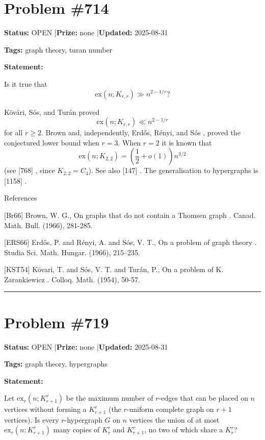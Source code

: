 \documentclass{article}
\begin{document}
\section{Problem \#714}
\label{prob:714}

\noindent\textbf{Status:} OPEN \quad|\quad \textbf{Prize:} none \quad|\quad \textbf{Updated:} 2025-08-31

\noindent\textbf{Tags:} graph theory, turan number

\medskip

\noindent\textbf{Statement:}

Is it true that\[\mathrm{ex}(n; K_{r,r}) \gg n^{2-1/r}?\]




K\"{o}v\'{a}ri, S\'{o}s, and Tur\'{a}n \cite{KST54} proved\[\mathrm{ex}(n; K_{r,r}) \ll n^{2-1/r}\]for all $r\geq 2$. Brown \cite{Br66} and, independently, Erd\H{o}s, R\'{e}nyi, and S\'{o}s \cite{ERS66}, proved the conjectured lower bound when $r=3$. When $r=2$ it is known that\[\mathrm{ex}(n;K_{2,2})=\left(\frac{1}{2}+o(1)\right)n^{3/2}\](see [768] , since $K_{2,2}=C_4$). See also [147] . The generalisation to hypergraphs is [1158] .




References

[Br66] Brown, W. G., On graphs that do not contain a Thomsen graph . Canad. Math. Bull. (1966), 281-285.

[ERS66] Erd\H{o}s, P. and R\'{e}nyi, A. and S\'os, V. T., On a problem of graph theory . Studia Sci. Math. Hungar. (1966), 215--235.

[KST54] K\"{o}vari, T. and S\'{o}s, V. T. and Tur\'{a}n, P., On a problem of K. Zarankiewicz . Colloq. Math. (1954), 50-57.

\noindent\rule{\linewidth}{0.4pt}


\section{Problem \#719}
\label{prob:719}

\noindent\textbf{Status:} OPEN \quad|\quad \textbf{Prize:} none \quad|\quad \textbf{Updated:} 2025-08-31

\noindent\textbf{Tags:} graph theory, hypergraphs

\medskip

\noindent\textbf{Statement:}

Let $\mathrm{ex}_r(n;K_{r+1}^r)$ be the maximum number of $r$-edges that can be placed on $n$ vertices without forming a $K_{r+1}^r$ (the $r$-uniform complete graph on $r+1$ vertices). Is every $r$-hypergraph $G$ on $n$ vertices the union of at most $\mathrm{ex}_{r}(n;K_{r+1}^r)$ many copies of $K_r^r$ and $K_{r+1}^r$, no two of which share a $K_r^r$?
\end{document}
